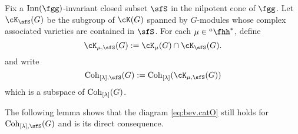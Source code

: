 \documentclass[counting_main.tex]{subfiles}
\begin{document}
\begin{eg}
  Fix a $\Inn(\fgg)$-invariant closed subset $\sfS$ in the nilpotent cone of
  $\fgg$. Let $\Grt_{\sfS}(G)$ be the subgroup of $\Grt(G)$ spanned by
  $G$-modules whose complex associated varieties are contained in $\sfS$. For
  each $\mu\in \ahh^{*}$, define
  \[
    \Grt_{\mu,\sfS}(G) := \Grt_{ \mu}(G)\cap \Grt_{\sfS}(G).
  \]
  and write
  \[
    \Coh_{[\lambda],\sfS}(G):= \Coh_{[\lambda]}(\Grt_{\mu,\sfS}(G))
  \]
  which is a subspace of $\mathrm{Coh}_{{[\lambda]}}(G)$.

\end{eg}



The following lemma shows that the diagram \cref{eq:bev.catO} still holds for
$\Coh_{[\lambda],\sfS}(G)$ and  is its direct consequence.

\end{document}
